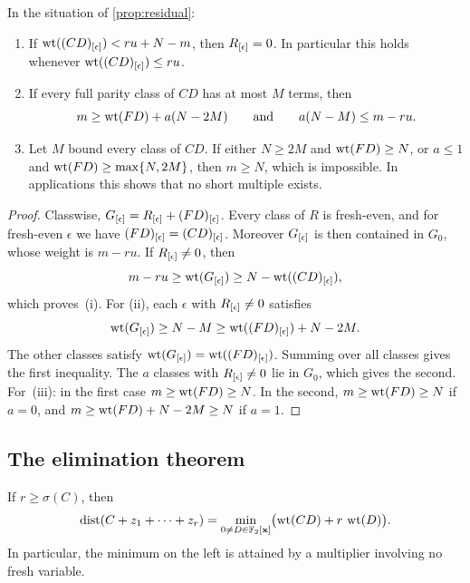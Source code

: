 \begin{corollary}\label{cor:protection}
In the situation of \cref{prop:residual}:
\begin{enumerate}[label=\textup{(\roman*)}]
\item If $\operatorname{wt}((CD)_{[\epsilon]})<ru+N-m$, then $R_{[\epsilon]}=0$. In particular this holds whenever $\operatorname{wt}((CD)_{[\epsilon]})\le ru$.
\item If every full parity class of $CD$ has at most $M$ terms, then
\[
 m\ge\operatorname{wt}(FD)+a(N-2M)\qquad\text{and}\qquad a(N-M)\le m-ru .
\]
\item Let $M$ bound every class of $CD$. If either $N\ge2M$ and $\operatorname{wt}(FD)\ge N$, or $a\le1$ and $\operatorname{wt}(FD)\ge\max\{N,2M\}$, then $m\ge N$, which is impossible. In applications this shows that no short multiple exists.
\end{enumerate}
\end{corollary}

\begin{proof}
Classwise, $G_{[\epsilon]}=R_{[\epsilon]}+(FD)_{[\epsilon]}$. Every class of $R$ is fresh-even, and for fresh-even $\epsilon$ we have $(FD)_{[\epsilon]}=(CD)_{[\epsilon]}$. Moreover $G_{[\epsilon]}$ is then contained in $G_0$, whose weight is $m-ru$. If $R_{[\epsilon]}\ne0$, then
\[
 m-ru\ge\operatorname{wt}(G_{[\epsilon]})\ge N-\operatorname{wt}((CD)_{[\epsilon]}),
\]
which proves~(i). For (ii), each $\epsilon$ with $R_{[\epsilon]}\ne0$ satisfies
\[
 \operatorname{wt}(G_{[\epsilon]})\ge N-M\ge\operatorname{wt}((FD)_{[\epsilon]})+N-2M.
\]
The other classes satisfy $\operatorname{wt}(G_{[\epsilon]})=\operatorname{wt}((FD)_{[\epsilon]})$. Summing over all classes gives the first inequality. The $a$ classes with $R_{[\epsilon]}\ne0$ lie in $G_0$, which gives the second. For~(iii): in the first case $m\ge\operatorname{wt}(FD)\ge N$. In the second, $m\ge\operatorname{wt}(FD)\ge N$ if $a=0$, and $m\ge\operatorname{wt}(FD)+N-2M\ge N$ if $a=1$.
\end{proof}

\subsection{The elimination theorem}

\begin{theorem}\label{thm:elimination}
If $r\ge\sigma(C)$, then
\[
 \operatorname{dist}(C+z_1+\cdots+z_r)=\min_{0\ne D\in\mathbb{F}_2[\mathbf{x}]}\bigl(\operatorname{wt}(CD)+r\,\operatorname{wt}(D)\bigr).
\]
In particular, the minimum on the left is attained by a multiplier involving no fresh variable.
\end{theorem}

